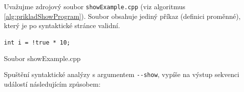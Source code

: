 \begin{priklad}
  Uvažujme zdrojový soubor \verb|showExample.cpp| (viz algoritmus \ref{alg:prikladShowProgram}). Soubor obsahuje jediný příkaz (definici proměnné), který je po syntaktické stránce
  validní.

  \begin{algorithm} \label{alg:prikladShowProgram}
    \DontPrintSemicolon
    \SetAlgoNoEnd


    \SetNlSty{}{}{:}
    \SetNlSkip{-1.1em}

    \Indp\Indpp
    \verb|int i = !true * 10;| \;
    \caption{Soubor showExample.cpp} \label{alg:prikladShowProgram}
  \end{algorithm}

  \setlength{\parindent}{0pt}

  Spuštění syntaktické analýzy s argumentem \verb|--show|, vypíše na výstup sekvenci událostí následujícím způsobem: \\



\end{priklad}
